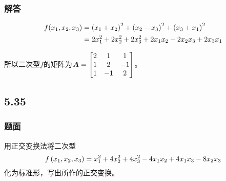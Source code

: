 \documentclass[9pt,xcolor=svgnames]{beamer} %
\begin{document}
\begin{frame}
    \frametitle{解答}
    \begin{align*}
        f(x_1,x_2,x_3) & =\left( x_1+x_2 \right)^2+\left( x_2-x_3 \right)^2+\left( x_3+x_1 \right)^2 \\
                       & =2x_1^2+2x_2^2+2x_3^2+2x_1x_2-2x_2x_3+2x_3x_1
    \end{align*}

    所以二次型\(f\)的矩阵为\(\boldsymbol{A}=\begin{bmatrix}2&1&1\\1&2&-1\\1&-1&2\end{bmatrix}\)。
\end{frame}

\subsection*{5.35}
\begin{frame}
    \frametitle{题面}
    用正交变换法将二次型
    \begin{equation*}
        f\left( x_1,x_2,x_3 \right)=x_1^2+4x_2^2+4x_3^2-4x_1x_2+4x_1x_3-8x_2x_3
    \end{equation*}
    化为标准形，写出所作的正交变换。
\end{frame}
\end{document}
